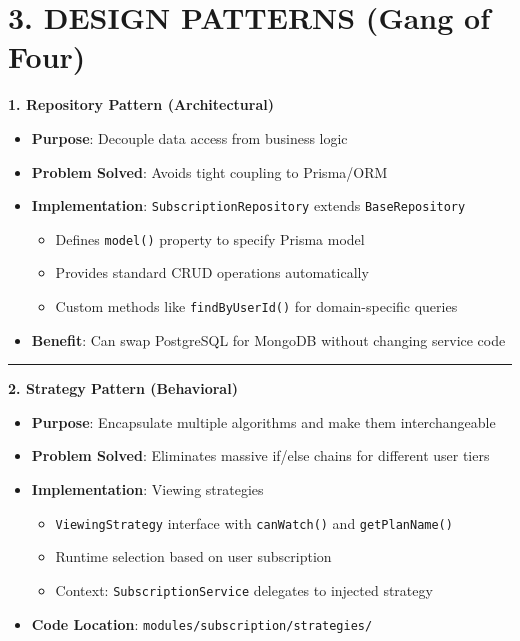 \documentclass[10pt]{article}
\begin{document}
\section*{\color{primary} 3. DESIGN PATTERNS (Gang of Four)}

\noindent
\begin{tcolorbox}[
  colback=white,
  colframe=dark,
  arc=3pt,
  boxrule=1pt,
  before skip=8pt,
  after skip=8pt
]

\textbf{1. Repository Pattern (Architectural)}
\begin{itemize}
\item \textbf{Purpose}: Decouple data access from business logic
\item \textbf{Problem Solved}: Avoids tight coupling to Prisma/ORM
\item \textbf{Implementation}: \texttt{SubscriptionRepository} extends \texttt{BaseRepository}
\begin{itemize}
\item Defines \texttt{model()} property to specify Prisma model
\item Provides standard CRUD operations automatically
\item Custom methods like \texttt{findByUserId()} for domain-specific queries
\end{itemize}
\item \textbf{Benefit}: Can swap PostgreSQL for MongoDB without changing service code
\end{itemize}

\hrule

\textbf{2. Strategy Pattern (Behavioral)}
\begin{itemize}
\item \textbf{Purpose}: Encapsulate multiple algorithms and make them interchangeable
\item \textbf{Problem Solved}: Eliminates massive if/else chains for different user tiers
\item \textbf{Implementation}: Viewing strategies
\begin{itemize}
\item \texttt{ViewingStrategy} interface with \texttt{canWatch()} and \texttt{getPlanName()}
\item Runtime selection based on user subscription
\item Context: \texttt{SubscriptionService} delegates to injected strategy
\end{itemize}
\item \textbf{Code Location}: \texttt{modules/subscription/strategies/}
\end{itemize}


\end{tcolorbox}
\end{document}

